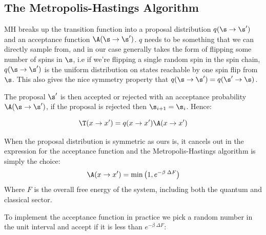 \hypertarget{the-metropolis-hastings-algorithm-1}{%
\subsection{The Metropolis-Hastings Algorithm}\label{the-metropolis-hastings-algorithm-1}}

MH breaks up the transition function into a proposal distribution \(q(\s \to \s')\) and an acceptance function \(\A(\s \to \s')\). \(q\) needs to be something that we can directly sample from, and in our case generally takes the form of flipping some number of spins in \(\s\), i.e if we're flipping a single random spin in the spin chain, \(q(\s \to \s')\) is the uniform distribution on states reachable by one spin flip from \(\s\). This also gives the nice symmetry property that \(q(\s \to \s') = q(\s' \to \s)\).

The proposal \(\s'\) is then accepted or rejected with an acceptance probability \(\A(\s \to \s')\), if the proposal is rejected then \(\s_{i+1} = \s_{i}\). Hence:

\[\T(x\to x') = q(x\to x')\A(x \to x')\]

When the proposal distribution is symmetric as ours is, it cancels out in the expression for the acceptance function and the Metropolis-Hastings algorithm is simply the choice: \[\A(x \to x') = \min\left(1, e^{-\beta\;\Delta F}\right)\] Where \(F\) is the overall free energy of the system, including both the quantum and classical sector.

To implement the acceptance function in practice we pick a random number in the unit interval and accept if it is less than \(e^{-\beta\;\Delta F}\):

\begin{Shaded}
\begin{Highlighting}[]
\OperatorTok{=}

 
\OperatorTok{=}
\OperatorTok{=}

    \NormalTok{,}\NormalTok{) }\OperatorTok{\textless{}}\OperatorTok{{-}}\OperatorTok{*}
\OperatorTok{=}
        
\OperatorTok{=}
\end{Highlighting}
\end{Shaded}


